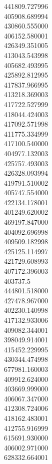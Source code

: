 441809.727996\\
405908.689994\\
430860.555000\\
406152.580001\\
426349.351005\\
413043.543998\\
405682.493995\\
425892.812995\\
417837.966995\\
413218.369003\\
417722.527999\\
418044.424003\\
417092.571998\\
411775.334999\\
417100.540000\\
404977.132003\\
425757.493003\\
426328.093994\\
419791.510002\\
405747.554000\\
422134.178001\\
401249.620002\\
469197.847000\\
404092.696998\\
409509.182998\\
425125.114997\\
421729.608993\\
407172.396003\\
403737.5\\
444801.518000\\
427478.967000\\
402230.140998\\
417132.933006\\
409082.344001\\
398049.914001\\
415452.229995\\
430344.474998\\
677981.160003\\
409912.624000\\
403669.999000\\
406067.347000\\
412308.724006\\
418162.483001\\
412755.916999\\
615691.930000\\
406002.971000\\
628332.664001\\
